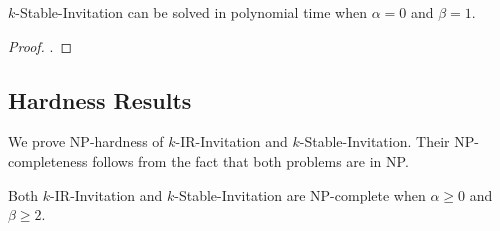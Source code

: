 \begin{theorem} \label{SIP:thm:easiness_stable_a0_b1}
	$k$-Stable-Invitation can be solved in polynomial time when $\alpha =0$ and $\beta = 1$.
\end{theorem} 
\begin{proof} %
	.
\end{proof}




\subsection{Hardness Results}

We prove NP-hardness of $k$-IR-Invitation and $k$-Stable-Invitation. Their NP-completeness follows from the fact that both problems are in NP.

\begin{theorem} \label{SIP:thm:nphard_a0_b2}
	Both $k$-IR-Invitation and $k$-Stable-Invitation are NP-complete when $\alpha \geq 0$ and $\beta \geq 2$. 
\end{theorem} 
